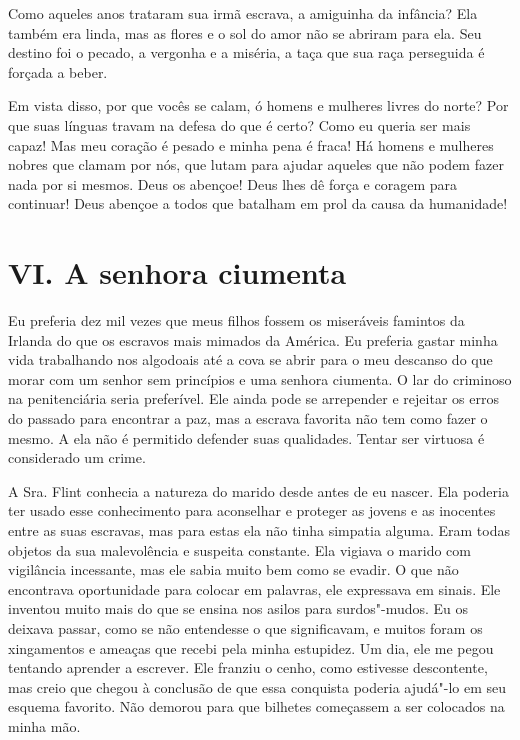 Como aqueles anos trataram sua irmã
escrava, a amiguinha da infância? Ela também era linda, mas as flores e
o sol do amor não se abriram para ela. Seu destino foi o pecado, a
vergonha e a miséria, a taça que sua raça perseguida é forçada a beber.

Em vista disso, por que vocês se calam,
ó homens e mulheres livres do norte? Por que suas línguas travam na
defesa do que é certo? Como eu queria ser mais capaz! Mas meu coração é
pesado e minha pena é fraca! Há homens e mulheres nobres que clamam por
nós, que lutam para ajudar aqueles que não podem fazer nada por si
mesmos. Deus os abençoe! Deus lhes dê força e coragem para continuar!
Deus abençoe a todos que batalham em prol da causa da humanidade!

\chapter{VI. A senhora ciumenta}

Eu preferia dez mil vezes que meus
filhos fossem os miseráveis famintos da Irlanda do que os escravos mais
mimados da América. Eu preferia gastar minha vida trabalhando nos
algodoais até a cova se abrir para o meu descanso do que morar com um
senhor sem princípios e uma senhora ciumenta. O lar do criminoso na
penitenciária seria preferível. Ele ainda pode se arrepender e rejeitar
os erros do passado para encontrar a paz, mas a escrava favorita não tem
como fazer o mesmo. A ela não é permitido defender suas qualidades.
Tentar ser virtuosa é considerado um crime.

A Sra. Flint conhecia a natureza do
marido desde antes de eu nascer. Ela poderia ter usado esse conhecimento
para aconselhar e proteger as jovens e as inocentes entre as suas
escravas, mas para estas ela não tinha simpatia alguma. Eram todas
objetos da sua malevolência e suspeita constante. Ela vigiava o marido
com vigilância incessante, mas ele sabia muito bem como se evadir. O que
não encontrava oportunidade para colocar em palavras, ele expressava em
sinais. Ele inventou muito mais do que se ensina nos asilos para
surdos"-mudos. Eu os deixava passar, como se não entendesse o que
significavam, e muitos foram os xingamentos e ameaças que recebi pela
minha estupidez. Um dia, ele me pegou tentando aprender a escrever. Ele
franziu o cenho, como estivesse descontente, mas creio que chegou à
conclusão de que essa conquista poderia ajudá"-lo em seu esquema
favorito. Não demorou para que bilhetes começassem a ser colocados na
minha mão.

